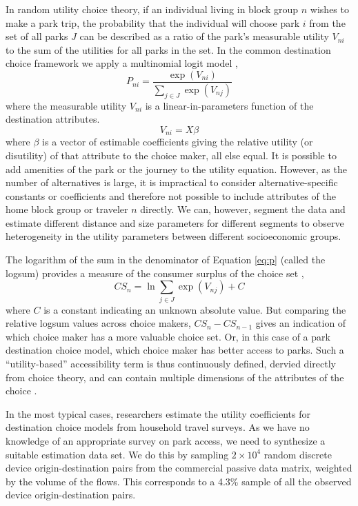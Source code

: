 \documentclass[]{elsarticle} %
\begin{document}
In random utility choice theory, if an individual living in block group \(n\)
wishes to make a park trip, the probability that the individual will choose
park \(i\) from the set of all parks \(J\) can be described as a ratio of the
park's measurable utility \(V_{ni}\) to the sum of the utilities for all parks
in the set. In the common destination choice framework we apply a
multinomial logit model \citep[\citet{Recker1978}]{McFadden1974},
\begin{equation}\label{eq:p}
   P_{ni} = \frac{\exp(V_{ni})}{\sum_{j \in J}\exp(V_{nj})}
\end{equation}
where the measurable utility \(V_{ni}\) is a linear-in-parameters function of
the destination attributes.
\begin{equation}\label{eq:V}
V_{ni} = X\beta
\end{equation}
where \(\beta\) is a vector of estimable coefficients giving the relative utility
(or disutility) of that attribute to the choice maker, all else equal. It is
possible to add amenities of the park or the journey to the utility
equation. However, as the number of alternatives is large, it is impractical to
consider alternative-specific constants or coefficients and therefore not
possible to include attributes of the home block group or traveler \(n\) directly.
We can, however, segment the data and estimate different distance and size
parameters for different segments to observe heterogeneity in the utility
parameters between different socioeconomic groups.

The logarithm of the sum in the denominator of Equation \ref{eq:p} (called the
logsum) provides a measure of the consumer surplus of the choice set
\citep{Williams1977a},
\begin{equation}\label{eq:logsum}
CS_n = \ln{{\sum_{j \in J}\exp(V_{nj})}} + C
\end{equation}
where \(C\) is a constant indicating an unknown absolute value. But comparing the
relative logsum values across choice makers, \(CS_n - CS_{n-1}\) gives an
indication of which choice maker has a more valuable choice set. Or, in this
case of a park destination choice model, which choice maker has better access to
parks. Such a ``utility-based'' accessibility term is thus continuously defined,
dervied directly from choice theory, and can contain multiple dimensions of the
attributes of the choice \citep{Handy1997, Dong2006}.

In the most typical cases, researchers estimate the utility coefficients for
destination choice models from household travel surveys. As we have no knowledge
of an appropriate survey on park access, we need to synthesize a suitable
estimation data set. We do this by sampling
\ensuremath{2\times 10^{4}} random discrete device origin-destination pairs from the commercial
passive data matrix, weighted by the volume of the flows. This corresponds to a
4.3\% sample of all the observed device
origin-destination pairs.
\end{document}
